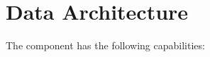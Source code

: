 \chapter{Data Architecture}\label{ch:ekg-mm-b-2}\label{ch:ekg-mm-data-architecture} %

The  component has the following capabilities:

\begin{itemize}[leftmargin=.5in]
\end{itemize}




